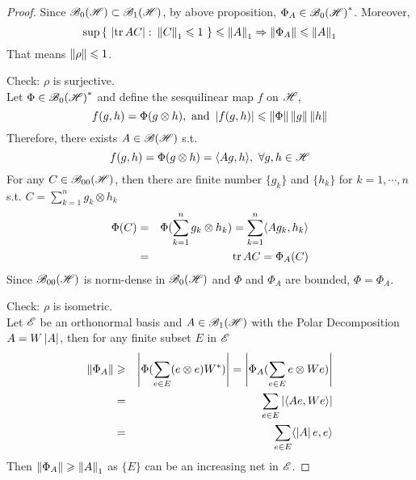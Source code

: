 \begin{proof}
	Since $\mathscr{B}_{0}\mathscr{(H)} \subset \mathscr{B}_{1}\mathscr{(H)}$, by above proposition, $\Phi_A \in \mathscr{B}_{0}\mathscr{(H)}^{*}$. Moreover, 
	\begin{equation*}
		\sup{\{~\left\lvert\operatorname{tr}{AC}\right\lvert \colon \left\lVert C\right\lVert_1 \leqslant 1~\}} \leqslant \left\lVert A\right\lVert_1 \Rightarrow  \left\lVert\Phi_A\right\lVert \leqslant \left\lVert A\right\lVert_1
	\end{equation*}
	That means $\left\lVert\rho\right\lVert \leqslant 1$.
	\item Check: $\rho$ is surjective.\\
	Let $\Phi \in \mathscr{B}_{0}\mathscr{(H)}^{*}$ and define the sesquilinear map $f$ on $\mathscr{H}$,
	\begin{equation*}
		f(g,h) = \Phi(g \otimes h), \text{ and } \left\lvert f(g,h)\right\lvert \leqslant \left\lVert\Phi\right\lVert\left\lVert g\right\lVert\left\lVert h\right\lVert
	\end{equation*}
	Therefore, there exists $A \in \mathscr{B(H)}$ s.t.
	\begin{equation*}
		f(g,h) = \Phi(g \otimes h) = \langle Ag, h \rangle,~\forall g,h \in \mathscr{H}
	\end{equation*}
	For any $C \in \mathscr{B}_{00}\mathscr{(H)}$, then there are finite number $\{g_k\}$ and $\{h_k\}$ for $k=1,\cdots,n$ s.t. $C = \sum_{k=1}^{n} g_k \otimes h_k$
	\begin{eqnarray*}
		\Phi(C) &=& \Phi(\sum_{k=1}^{n} g_k \otimes h_k) = \sum_{k=1}^{n} \langle A g_k , h_k \rangle \\
		&=& \operatorname{tr}{AC} = \Phi_A(C)
	\end{eqnarray*}
	Since $\mathscr{B}_{00}\mathscr{(H)}$ is norm-dense in $\mathscr{B}_{0}\mathscr{(H)}$ and $\Phi$ and $\Phi_A$ are bounded, $\Phi = \Phi_A$.
	\item Check: $\rho$ is isometric.\\
	Let $\mathscr{E}$ be an orthonormal basis and $A \in \mathscr{B}_{1}\mathscr{(H)}$ with the Polar Decomposition $A = W\left\lvert A\right\lvert$, then for any finite subset $E$ in $\mathscr{E}$
	\begin{eqnarray*}
		\left\lVert\Phi_A\right\lVert &\geqslant& \left\lvert\Phi(\sum_{e \in E}(e \otimes e)W^{*})\right\lvert = \left\lvert\Phi_A(\sum_{e \in E}e \otimes We)\right\lvert \\
		&=& \sum_{e \in E} \left\lvert\langle Ae,We \rangle\right\lvert \\
		&=& \sum_{e \in E} \langle \left\lvert A\right\lvert e, e \rangle
	\end{eqnarray*}
	Then $\left\lVert\Phi_A\right\lVert \geqslant \left\lVert A\right\lVert_1$ as $\{E\}$ can be an increasing net in $\mathscr{E}$.
\end{proof}

